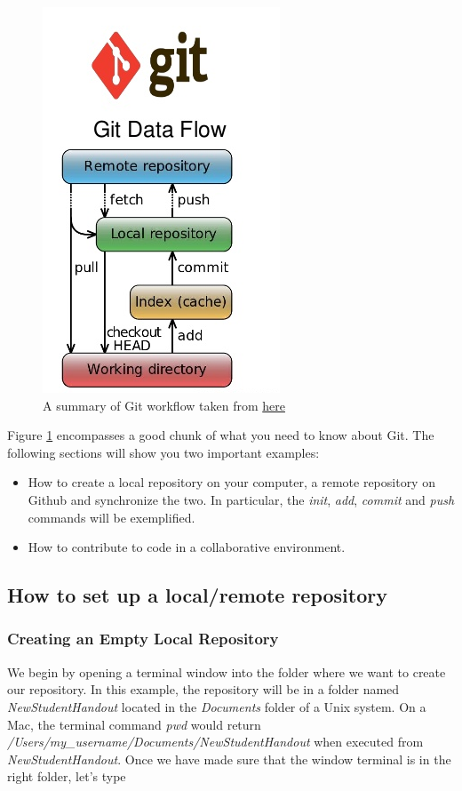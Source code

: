 \begin{figure}[H]
\centering
\includegraphics[scale=0.6]{git_workflow}
\caption{A summary of Git workflow taken from \href{http://www.slideshare.net/VinothKumarKannan/svn-vs-mercurial-vs-github}{here} }
\label{fig:git_workflow}
\end{figure}
Figure \ref{fig:git_workflow} encompasses a good chunk of what you need to know about Git. The following sections will show you two important examples:
\begin{itemize}
\item [1.] How to create a local repository on your computer, a remote repository on Github and synchronize the two. In particular, the \textit{init}, \textit{add}, \textit{commit} and \textit{push} commands will be exemplified. 
\item [2.] How to contribute to code in a collaborative environment.
\end{itemize}
\subsection{How to set up a local/remote repository}

\subsubsection{Creating an Empty Local Repository}

We begin by opening a terminal window into the folder where we want to create our repository. In this example, the repository will be in a folder named \textit{NewStudentHandout} located in the \textit{Documents} folder of a Unix system. On a Mac, the terminal command \textit{pwd} would return 
\textit{/Users/my\_username/Documents/NewStudentHandout} when executed from \textit{NewStudentHandout}. Once we have made sure that the window terminal is in the right folder, let's type

